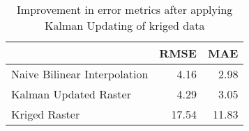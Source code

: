 \begin{table}
\centering
\caption{Improvement in error metrics after applying Kalman Updating of kriged data}
\label{tab:oahu4_gebco_raster_error}
\begin{tabular}{lrr}
\toprule
 & RMSE & MAE \\
\midrule
Naive Bilinear Interpolation & 4.16 & 2.98 \\
Kalman Updated Raster & 4.29 & 3.05 \\
Kriged Raster & 17.54 & 11.83 \\
\bottomrule
\end{tabular}
\end{table}
